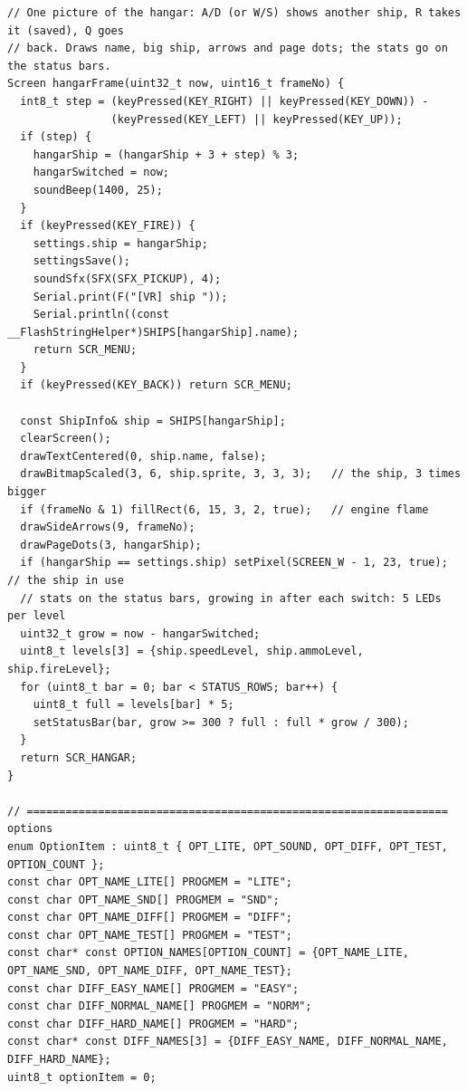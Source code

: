\documentclass[11pt,a4paper]{article}
\begin{document}
\begin{lstlisting}[language=Arduino]
// One picture of the hangar: A/D (or W/S) shows another ship, R takes it (saved), Q goes
// back. Draws name, big ship, arrows and page dots; the stats go on the status bars.
Screen hangarFrame(uint32_t now, uint16_t frameNo) {
  int8_t step = (keyPressed(KEY_RIGHT) || keyPressed(KEY_DOWN)) -
                (keyPressed(KEY_LEFT) || keyPressed(KEY_UP));
  if (step) {
    hangarShip = (hangarShip + 3 + step) % 3;
    hangarSwitched = now;
    soundBeep(1400, 25);
  }
  if (keyPressed(KEY_FIRE)) {
    settings.ship = hangarShip;
    settingsSave();
    soundSfx(SFX(SFX_PICKUP), 4);
    Serial.print(F("[VR] ship "));
    Serial.println((const __FlashStringHelper*)SHIPS[hangarShip].name);
    return SCR_MENU;
  }
  if (keyPressed(KEY_BACK)) return SCR_MENU;

  const ShipInfo& ship = SHIPS[hangarShip];
  clearScreen();
  drawTextCentered(0, ship.name, false);
  drawBitmapScaled(3, 6, ship.sprite, 3, 3, 3);   // the ship, 3 times bigger
  if (frameNo & 1) fillRect(6, 15, 3, 2, true);   // engine flame
  drawSideArrows(9, frameNo);
  drawPageDots(3, hangarShip);
  if (hangarShip == settings.ship) setPixel(SCREEN_W - 1, 23, true);   // the ship in use
  // stats on the status bars, growing in after each switch: 5 LEDs per level
  uint32_t grow = now - hangarSwitched;
  uint8_t levels[3] = {ship.speedLevel, ship.ammoLevel, ship.fireLevel};
  for (uint8_t bar = 0; bar < STATUS_ROWS; bar++) {
    uint8_t full = levels[bar] * 5;
    setStatusBar(bar, grow >= 300 ? full : full * grow / 300);
  }
  return SCR_HANGAR;
}

// ================================================================= options
enum OptionItem : uint8_t { OPT_LITE, OPT_SOUND, OPT_DIFF, OPT_TEST, OPTION_COUNT };
const char OPT_NAME_LITE[] PROGMEM = "LITE";
const char OPT_NAME_SND[] PROGMEM = "SND";
const char OPT_NAME_DIFF[] PROGMEM = "DIFF";
const char OPT_NAME_TEST[] PROGMEM = "TEST";
const char* const OPTION_NAMES[OPTION_COUNT] = {OPT_NAME_LITE, OPT_NAME_SND, OPT_NAME_DIFF, OPT_NAME_TEST};
const char DIFF_EASY_NAME[] PROGMEM = "EASY";
const char DIFF_NORMAL_NAME[] PROGMEM = "NORM";
const char DIFF_HARD_NAME[] PROGMEM = "HARD";
const char* const DIFF_NAMES[3] = {DIFF_EASY_NAME, DIFF_NORMAL_NAME, DIFF_HARD_NAME};
uint8_t optionItem = 0;


\end{lstlisting}
\end{document}
